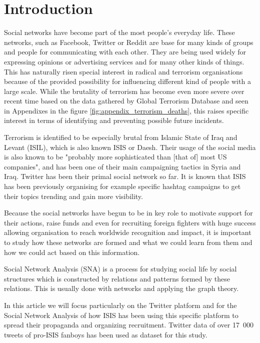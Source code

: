 \documentclass[conference]{IEEEtran}
\begin{document}
\section{Introduction}\label{sec:introduction}

Social networks have become part of the most people's everyday life.
These networks, such as Facebook, Twitter or Reddit are base for many kinds of groups and people for communicating with each other.
They are being used widely for expressing opinions or advertising services and for many other kinds of things.
This has naturally risen special interest in radical and terrorism organisations because of the provided possibility for
influencing different kind of people with a large scale.
While the brutality of terrorism has become even more severe over recent time based on the data gathered by Global
Terrorism Database and seen in Appendixes in the figure \ref{fig:appendix_terrorism_deaths}, this raises specific interest
in terms of identifying and preventing possible future incidents.

Terrorism is identified to be especially brutal from Islamic State of Iraq and Levant (ISIL), which is also known ISIS
or Daesh.\cite{enwiki:1024074085}
Their usage of the social media is also known to be "probably more sophisticated than [that of] most US companies",\cite{isis-selling-terror}
and has been one of their main campaigning tactics in Syria and Iraq.
Twitter has been their primal social network\cite{isis-how-twitter} so far.
It is known that ISIS has been previously organising for example specific hashtag campaigns to get their topics
trending and gain more visibility\cite{isis-how-twitter}.

Because the social networks have begun to be in key role to motivate support for their actions, raise funds and even for recruiting
foreign fighters with huge success\cite{isis-foreign-fighter} allowing organisation to reach worldwide recognition and impact,
it is important to study how these networks are formed and what we could learn from them and how we could act based on this information.

Social Network Analysis (SNA) is a process for studying social life by social structures which is constructed by relations and patterns formed by these relations.
This is usually done with networks and applying the graph theory.\cite{marin2011social, doi:10.1177/016555150202800601}

In this article we will focus particularly on the Twitter platform and for the Social Network Analysis of how ISIS  has been using this specific
platform to spread their propaganda and organizing recruitment.
Twitter data of over 17~000 tweets of pro-ISIS fanboys has been used as dataset for this study.
\end{document}
